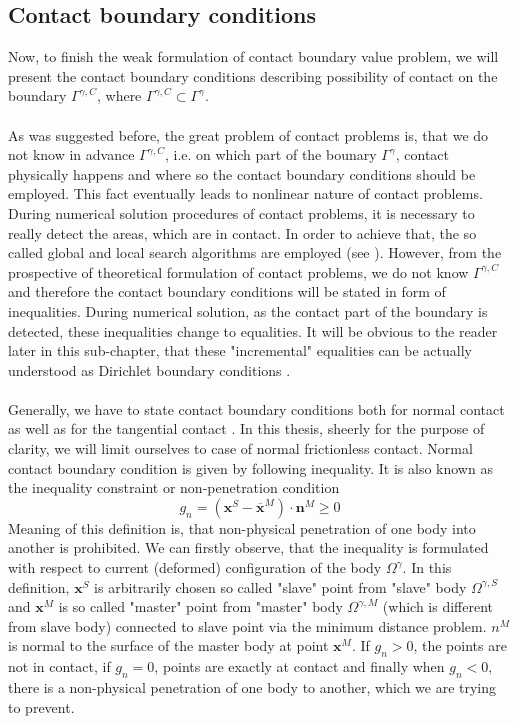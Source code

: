 \documentclass{article}
\newcommand{\beq}{\begin{equation}}
\newcommand{\eeq}{\end{equation}}
\begin{document}
\subsection{Contact boundary conditions}
Now, to finish the weak formulation of contact boundary value problem, we will present the contact boundary conditions describing possibility of contact on the boundary $ \Gamma^{\gamma,C}$, where $ \Gamma^{\gamma,C} \subset \Gamma^{\gamma} $.
\\
\\
As was suggested before, the great problem of contact problems is, that we do not know in advance $ \Gamma^{\gamma,C}$, i.e. on which part of the bounary $ \Gamma^{\gamma} $, contact physically happens and where so the contact boundary conditions should be employed. This fact eventually leads to nonlinear nature of contact problems. During numerical solution procedures of contact problems, it is necessary to really detect the areas, which are in contact. In order to achieve that, the so called global and local search algorithms are employed (see \cite[Chapter 9]{Wriggers}). However, from the prospective of theoretical formulation of contact problems, we do not know $ \Gamma^{\gamma,C}$ and therefore the contact boundary conditions will be stated in form of inequalities. During numerical solution, as the contact part of the boundary is detected, these inequalities change to equalities. It will be obvious to the reader later in this sub-chapter, that these "incremental" equalities can be actually understood as Dirichlet boundary conditions \cite[Chapter 4, p.109]{Yastrebov}.
\\
\\
Generally, we have to state contact boundary conditions both for normal contact as well as for the tangential contact \cite[Chapter 3, p.46]{Wriggers}. In this thesis, sheerly for the purpose of clarity, we will limit ourselves to case of normal frictionless contact. Normal contact boundary condition is given by following inequality. It is also known as the inequality constraint or non-penetration condition \cite[Chapter 3, p.47]{Wriggers}  
\beq\label{9}
g_{n}=\left(\mathbf{x}^{S}-\overline{\mathbf{x}}^{M}\right) \cdot \mathbf{n}^{M} \geq 0
\eeq  
Meaning of this definition is, that non-physical penetration of one body into another is  prohibited. We can firstly observe, that the inequality is formulated with respect to current (deformed) configuration of the body $\Omega^{\gamma} $. In this definition, $ \mathbf{x}^{S} $ is arbitrarily chosen so called "slave" point from "slave" body $\Omega^{\gamma,S} $ and $\mathbf{x}^{M} $ is so called "master" point from "master" body $\Omega^{\gamma,M} $ (which is different from slave body) connected to slave point via the minimum distance problem. $ n^{M} $ is normal to the surface of the master body at point $\mathbf{x}^{M} $. If $ g_{n} > 0 $, the points are not in contact, if $ g_{n} = 0 $, points are exactly at contact and finally when $ g_{n} < 0 $, there is a non-physical   penetration of one body to another, which we are trying to prevent.   
\end{document}
